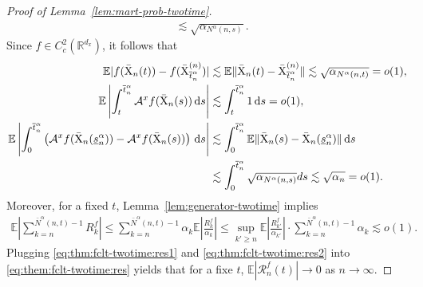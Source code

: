 \documentclass[11pt]{article}
\theoremstyle{plain}
\theoremstyle{definition}
\def\d{\mathrm{d}}
\def\AM{{\mathcal A}}
\def\RM{{\mathcal R}}
\def\RB{{\mathbb R}}
\def\EB{{\mathbb E}}
\newcommand{\xbar}{{\bar{\textnormal{X}}}}
\newcommand{\ssum}[3]{\sum\limits_{{#1}={#2}}^{#3}}
\begin{document}
\begin{appendix}
\begin{proof}[Proof of Lemma~\ref{lem:mart-prob-twotime}]
\begin{align*}
        & \lesssim \sqrt{ \alpha_{N^\alpha(n,s)} }.
    \end{align*}
    Since $f \in C_c^2(\RB^{d_x})$, it follows that
    \begin{align}\label{eq:thm:fclt-twotime:res1}
        \begin{split}
            \EB | f(\xbar_{n}(t)) - f(\xbar^{(n)}_{\overline{t}^\alpha_{n}}) |
            & \lesssim \EB \| \xbar_{n}(t) - \xbar^{(n)}_{\overline{t}^\alpha_{n} } \| \lesssim \sqrt{\alpha_{N^\alpha(n,t)}} = o(1), \\
            \EB \left| \int_t^{\overline{t}^\alpha_{n}} \AM^x f(\xbar_{n}(s)) \,\d s \right|
            & \lesssim \int_t^{\overline{t}^\alpha_{n}} 1 \,\d s 
            = o(1), \\
            \EB \left| \int_0^{\overline{t}^\alpha_{n}} \left( \AM^x f(\xbar_{n} (\underline{s}^\alpha_{n}) ) - \AM^x f(\xbar_{n}(s)) \right) \,\d s \right|
            & \lesssim \int_0^{\overline{t}^\alpha_{n}} \EB \| \xbar_{n}(s) - \xbar_{n} (\underline{s}^\alpha_{n} ) \| \,\d s \\
            &   \lesssim \int_0^{\overline{t}^\alpha_{n}} \sqrt{\alpha_{N^\alpha(n,s)} } ds \lesssim \sqrt{\alpha_{n}} = o(1).
        \end{split}
    \end{align}
    Moreover, for a fixed $t$, Lemma~\ref{lem:generator-twotime} implies
    \begin{align}\label{eq:thm:fclt-twotime:res2}
        \EB \left| \ssum{k}{n}{\bar{N}^\alpha(n,t) - 1} R^f_k \right|
        \le \ssum{k}{n}{\bar{N}^\alpha(n,t) - 1} \alpha_{k} \EB \left| \frac{R^f_k}{\alpha_{k}} \right|
        \le \sup_{k' \ge n} \EB \left| \frac{R^f_{k'}}{\alpha_{k'}} \right| \cdot \ssum{k}{n}{\bar{N}^\alpha(n,t) - 1} \alpha_{k} \lesssim o(1).
    \end{align}
    Plugging \eqref{eq:thm:fclt-twotime:res1} and \eqref{eq:thm:fclt-twotime:res2} into \eqref{eq:them:fclt-twotime:res} yields that for a fixe $t$, $\EB | \RM_{n}^f(t) | \to 0$ as $n \to \infty$.
    \vspace{0.2cm}
    

\end{proof}
\end{appendix}
\end{document}
